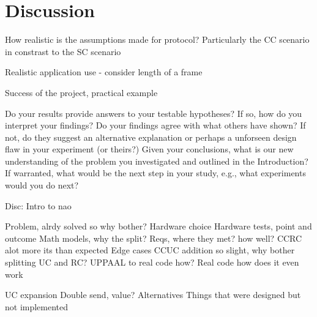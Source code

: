 \chapter{Discussion}
How realistic is the assumptions made for protocol? Particularly the CC scenario in constrast to the SC scenario

Realistic application use - consider length of a frame

Success of the project, practical example


Do your results provide answers to your testable hypotheses? If so, how do you interpret your findings?
Do your findings agree with what others have shown? If not, do they suggest an alternative explanation or perhaps a unforseen design flaw in your experiment (or theirs?)
Given your conclusions, what is our new understanding of the problem you investigated and outlined in the Introduction?
If warranted, what would be the next step in your study, e.g., what experiments would you do next?

Disc: Intro to nao

Problem, alrdy solved so why bother?
Hardware choice
Hardware tests, point and outcome
Math models, why the split?
Reqs, where they met? how well?
CCRC alot more its than expected
Edge cases
CCUC addition so slight, why bother splitting UC and RC?
UPPAAL to real code how?
Real code how does it even work

UC expansion
Double send, value?
Alternatives
Things that were designed but not implemented
